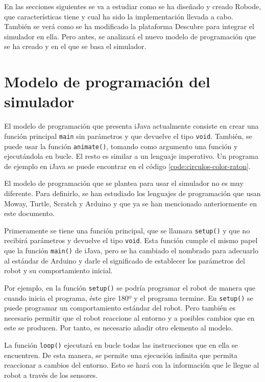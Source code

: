 En las secciones siguientes se va a estudiar como se ha diseñado y creado Robode, que características tiene y cual ha sido la implementación llevada a cabo. También se verá como se ha modificado la plataforma Descubre para integrar el simulador en ella. Pero antes, se analizará el nuevo modelo de programación que se ha creado y en el que se basa el simulador.



\section{Modelo de programación del simulador}
\label{sec:modelo-programacion}

El modelo de programación que presenta iJava actualmente consiste en crear una función principal \texttt{main} sin parámetros y que devuelve el tipo \texttt{void}. También, se puede usar la función \texttt{animate()}, tomando como argumento una función y ejecutándola en bucle. El resto es similar a un lenguaje imperativo. Un programa de ejemplo en iJava se puede encontrar en el código \ref{code:circulos-color-raton}.

El modelo de programación que se plantea para usar el simulador no es muy diferente. Para definirlo, se han estudiado los lenguajes de programación que usan Moway, Turtle, Scratch y Arduino y que ya se han mencionado anteriormente en este documento.


Primeramente se tiene una función principal, que se llamara \texttt{setup()} y que no recibirá parámetros y devuelve el tipo \texttt{void}. Esta función cumple el mismo papel que la función \texttt{main()} de iJava, pero se ha cambiado el nombrado para adecuarlo al estándar de Arduino y darle el significado de establecer los parámetros del robot y su comportamiento inicial. 

Por ejemplo, en la función \texttt{setup()} se podría programar el robot de manera que cuando inicia el programa, éste gire 180º y el programa termine. En \texttt{setup()} se puede programar un comportamiento estándar del robot. Pero también es necesario permitir que el robot reaccione al entorno y a posibles cambios que en este se producen. Por tanto, es necesario añadir otro elemento al modelo.

La función \texttt{loop()} ejecutará en bucle todas las instrucciones que en ella se encuentren. De esta manera, se permite una ejecución infinita que permita reaccionar a cambios del entorno. Esto se hará con la información que le llegue al robot a través de los sensores. 


